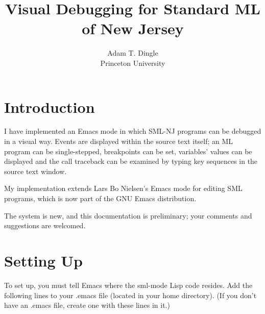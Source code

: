 \setlength{\textheight}{8.8in}
\setlength{\textwidth}{6.5in}
\setlength{\oddsidemargin}{0in}
\setlength{\topmargin}{-.1in}
\setlength{\headheight}{0in}
\setlength{\headsep}{0in}

\title{Visual Debugging for Standard ML of New Jersey}
\author{Adam T. Dingle \\ Princeton University}

\maketitle
\section{Introduction}
I have implemented an Emacs mode in which SML-NJ programs can be
debugged in a visual way.  Events are displayed within the source text
itself; an ML program can be single-stepped, breakpoints can be set,
variables' values can be displayed and the call traceback can be
examined by typing key sequences in the source text window.

My implementation extends Lars Bo Nielsen's Emacs mode for
editing SML programs, which is now part of the GNU Emacs distribution.

The system is new, and this documentation is preliminary; your
comments and suggestions are welcomed.

\section{Setting Up}
To set up, you must tell Emacs where the sml-mode Lisp code resides.
Add the following lines to your .emacs file (located in your home
directory).  (If you don't have an .emacs file, create one with these
lines in it.)

